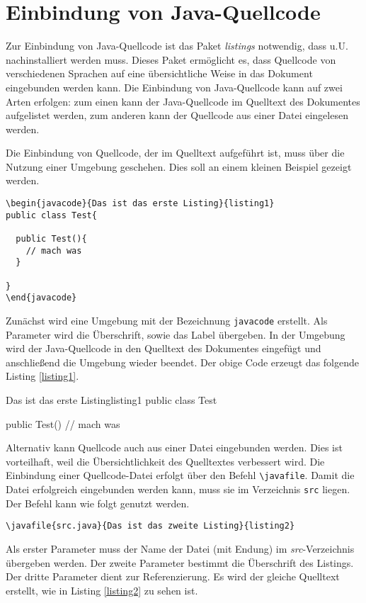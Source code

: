 %
\section{Einbindung von Java-Quellcode}
%
Zur Einbindung von Java-Quellcode ist das Paket \emph{listings} notwendig, dass u.U. nachinstalliert werden muss. 
Dieses Paket ermöglicht es, dass Quellcode von verschiedenen Sprachen auf eine übersichtliche Weise in das Dokument eingebunden werden kann. 
Die Einbindung von Java-Quellcode kann auf zwei Arten erfolgen: zum einen kann der Java-Quellcode im Quelltext des Dokumentes aufgelistet werden, zum anderen kann der Quellcode aus einer Datei eingelesen werden.

Die Einbindung von Quellcode, der im Quelltext aufgeführt ist, muss über die Nutzung einer Umgebung geschehen. 
Dies soll an einem kleinen Beispiel gezeigt werden.
\begin{verbatim}
\begin{javacode}{Das ist das erste Listing}{listing1}
public class Test{

  public Test(){
    // mach was
  }

}
\end{javacode}
\end{verbatim}
%
Zunächst wird eine Umgebung mit der Bezeichnung \texttt{javacode} erstellt. 
Als Parameter wird die Überschrift, sowie das Label übergeben. 
In der Umgebung wird der Java-Quellcode in den Quelltext des Dokumentes eingefügt und anschließend die Umgebung wieder beendet. 
Der obige Code erzeugt das folgende Listing \ref{listing1}.

\begin{javacode}{Das ist das erste Listing}{listing1}
public class Test {

  public Test(){
    // mach was
  }

}
\end{javacode}

Alternativ kann Quellcode auch aus einer Datei eingebunden werden. 
Dies ist vorteilhaft, weil die Übersichtlichkeit des Quelltextes verbessert wird. 
Die Einbindung einer Quellcode-Datei erfolgt über den Befehl \texttt{\textbackslash javafile}. 
Damit die Datei erfolgreich eingebunden werden kann, muss sie im Verzeichnis \texttt{src} liegen. 
Der Befehl kann wie folgt genutzt werden.
\begin{verbatim}
\javafile{src.java}{Das ist das zweite Listing}{listing2}
\end{verbatim}

Als erster Parameter muss der Name der Datei (mit Endung) im \emph{src}-Verzeichnis übergeben werden. 
Der zweite Parameter bestimmt die Überschrift des Listings. 
Der dritte Parameter dient zur Referenzierung. 
Es wird der gleiche Quelltext erstellt, wie in Listing \ref{listing2} zu sehen ist.


